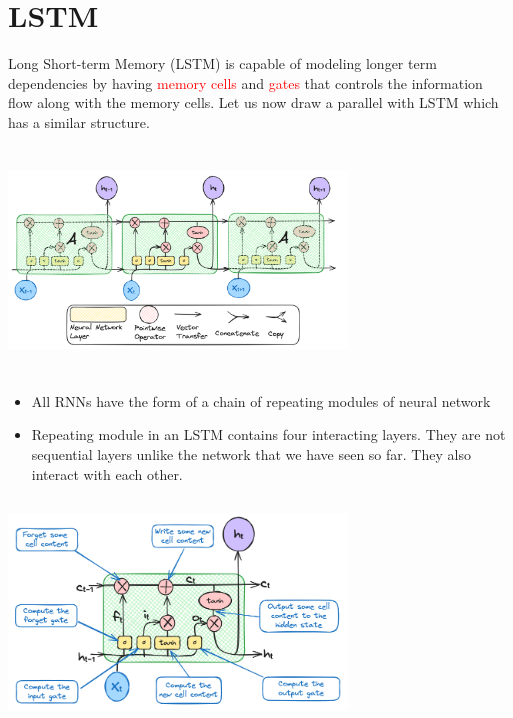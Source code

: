 \documentclass{article}
\begin{document}
\section{LSTM}
Long Short-term Memory (LSTM) is capable of modeling longer term dependencies by having \textcolor{red}{memory cells} and \textcolor{red}{gates} that controls the information flow along with the memory cells.
Let us now draw a parallel with LSTM which has a similar structure.\\
\begin{center}
  \includegraphics[width=9cm, height=6cm]{LSTM/images/LSTM2.png}   
\end{center}

\begin{itemize}
    \item All RNNs have the form of a chain of repeating modules of neural network
    \item Repeating module in an LSTM contains four interacting layers. They are not sequential layers unlike the network that we have seen so far. They also interact with each other. 
\end{itemize}
\begin{center}
    \includegraphics[width=9cm, height=6cm]{LSTM/images/LSTM3.png} 
\end{center}
\end{document}
